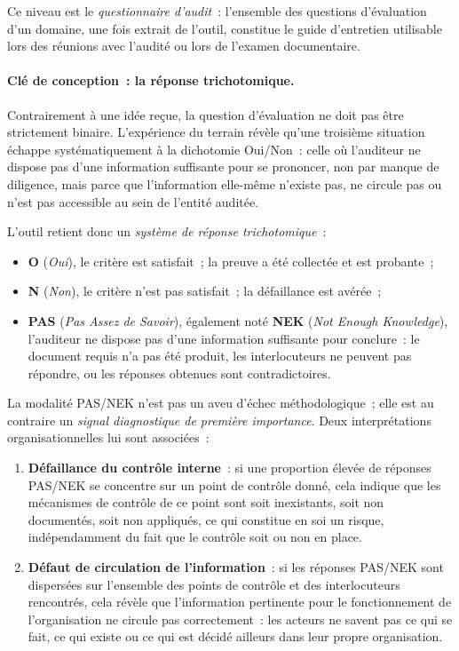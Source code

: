 Ce niveau est le \emph{questionnaire d'audit}~: l'ensemble des questions
d'évaluation d'un domaine, une fois extrait de l'outil, constitue le guide
d'entretien utilisable lors des réunions avec l'audité ou lors de l'examen
documentaire.

\paragraph{Clé de conception~: la réponse trichotomique.}
Contrairement à une idée reçue, la question d'évaluation ne doit pas être
strictement binaire. L'expérience du terrain révèle qu'une troisième situation
échappe systématiquement à la dichotomie Oui/Non~: celle où l'auditeur ne
dispose pas d'une information suffisante pour se prononcer, non par manque
de diligence, mais parce que l'information elle-même n'existe pas, ne circule
pas ou n'est pas accessible au sein de l'entité auditée.

L'outil retient donc un \emph{système de réponse trichotomique}~:

\begin{itemize}
  \item \textbf{O} (\emph{Oui}), le critère est satisfait~; la preuve a été
        collectée et est probante~;
  \item \textbf{N} (\emph{Non}), le critère n'est pas satisfait~; la
        défaillance est avérée~;
  \item \textbf{PAS} (\emph{Pas Assez de Savoir}), également noté
        \textbf{NEK} (\emph{Not Enough Knowledge}), l'auditeur ne dispose pas
        d'une information suffisante pour conclure~: le document requis n'a pas
        été produit, les interlocuteurs ne peuvent pas répondre, ou les réponses
        obtenues sont contradictoires.
\end{itemize}

La modalité PAS/NEK n'est pas un aveu d'échec méthodologique~; elle est au
contraire un \emph{signal diagnostique de première importance}. Deux
interprétations organisationnelles lui sont associées~:

\begin{enumerate}
  \item \textbf{Défaillance du contrôle interne}~: si une proportion élevée de
        réponses PAS/NEK se concentre sur un point de contrôle donné, cela
        indique que les mécanismes de contrôle de ce point sont soit inexistants,
        soit non documentés, soit non appliqués, ce qui constitue en
        soi un risque, indépendamment du fait que le contrôle soit ou non en
        place.
  \item \textbf{Défaut de circulation de l'information}~: si les réponses
        PAS/NEK sont dispersées sur l'ensemble des points de contrôle et des
        interlocuteurs rencontrés, cela révèle que l'information pertinente pour
        le fonctionnement de l'organisation ne circule pas correctement~: les
        acteurs ne savent pas ce qui se fait, ce qui existe ou ce qui est décidé
        ailleurs dans leur propre organisation.
\end{enumerate}

